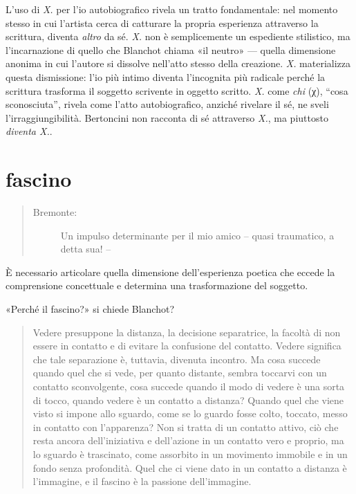 L'uso di \emph{X.} per l'io autobiografico rivela un tratto fondamentale: nel
momento stesso in cui l'artista cerca di catturare la propria esperienza
attraverso la scrittura, diventa \emph{altro} da sé. \emph{X.} non è
semplicemente un espediente stilistico, ma l'incarnazione di quello che Blanchot \cite{fare_ref}
chiama «il neutro» — quella dimensione anonima in cui l'autore si dissolve
nell'atto stesso della creazione. \emph{X.} materializza questa dismissione:
l'io più intimo diventa l'incognita più radicale perché la scrittura trasforma
il soggetto scrivente in oggetto scritto. \emph{X.} come \emph{chi} (χ), “cosa
sconosciuta”, rivela come l'atto autobiografico, anziché rivelare il sé, ne
sveli l'irraggiungibilità. Bertoncini non racconta di sé attraverso \emph{X.},
ma piuttosto \emph{diventa X.}.

\section*{fascino}


\begin{quote}
  \begin{sf}
    \small
    \begin{description}
      \item[Bremonte:] %
      Un impulso determinante per il mio amico – quasi traumatico, a detta sua! –
    \end{description}
  \end{sf}
\end{quote}

È necessario articolare quella dimensione dell'esperienza poetica che eccede la
comprensione concettuale e determina una trasformazione del soggetto.

«Perché il fascino?» si chiede Blanchot? \cite{blanchot82}

\begin{quote}
  \begin{sf}
    \small
    Vedere presuppone la distanza, la decisione separatrice, la facoltà di non essere in contatto e di evitare la confusione del contatto. Vedere significa che tale separazione è, tuttavia, divenuta incontro. Ma cosa succede quando quel che si vede, per quanto distante, sembra toccarvi con un contatto sconvolgente, cosa succede quando il modo di vedere è una sorta di tocco, quando vedere è un contatto a distanza? Quando quel che viene visto si impone allo sguardo, come se lo guardo fosse colto, toccato, messo in contatto con l’apparenza? Non si tratta di un contatto attivo, ciò che resta ancora dell’iniziativa e dell’azione in un contatto vero e proprio, ma lo sguardo è trascinato, come assorbito in un movimento immobile e in un fondo senza profondità. Quel che ci viene dato in un contatto a distanza è l’immagine, e il fascino è la passione dell’immagine.
  \end{sf}
\end{quote}

